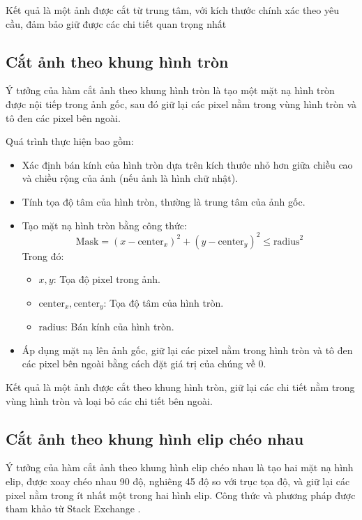 Kết quả là một ảnh được cắt từ trung tâm, với kích thước chính xác theo yêu cầu, đảm bảo giữ được các chi tiết quan trọng nhất

\subsection{Cắt ảnh theo khung hình tròn}
Ý tưởng của hàm cắt ảnh theo khung hình tròn là tạo một mặt nạ hình tròn được nội tiếp trong ảnh gốc, sau đó giữ lại các pixel nằm trong vùng hình tròn và tô đen các pixel bên ngoài.

Quá trình thực hiện bao gồm:
\begin{itemize}
	\item Xác định bán kính của hình tròn dựa trên kích thước nhỏ hơn giữa chiều cao và chiều rộng của ảnh (nếu ảnh là hình chữ nhật).
	\item Tính tọa độ tâm của hình tròn, thường là trung tâm của ảnh gốc.
	\item Tạo mặt nạ hình tròn bằng công thức:
	      \[
		      \text{Mask} = (x - \text{center}_x)^2 + (y - \text{center}_y)^2 \leq \text{radius}^2
	      \]
	      Trong đó:
	      \begin{itemize}
		      \item \(x, y\): Tọa độ pixel trong ảnh.
		      \item \(\text{center}_x, \text{center}_y\): Tọa độ tâm của hình tròn.
		      \item \(\text{radius}\): Bán kính của hình tròn.
	      \end{itemize}
	\item Áp dụng mặt nạ lên ảnh gốc, giữ lại các pixel nằm trong hình tròn và tô đen các pixel bên ngoài bằng cách đặt giá trị của chúng về 0.
\end{itemize}

Kết quả là một ảnh được cắt theo khung hình tròn, giữ lại các chi tiết nằm trong vùng hình tròn và loại bỏ các chi tiết bên ngoài.

\subsection{Cắt ảnh theo khung hình elip chéo nhau}
Ý tưởng của hàm cắt ảnh theo khung hình elip chéo nhau là tạo hai mặt nạ hình elip, được xoay chéo nhau 90 độ, nghiêng 45 độ so với trục tọa độ, và giữ lại các pixel nằm trong ít nhất một trong hai hình elip. Công thức và phương pháp được tham khảo từ Stack Exchange \cite{stackexchange_ellipse_dimensions}.

